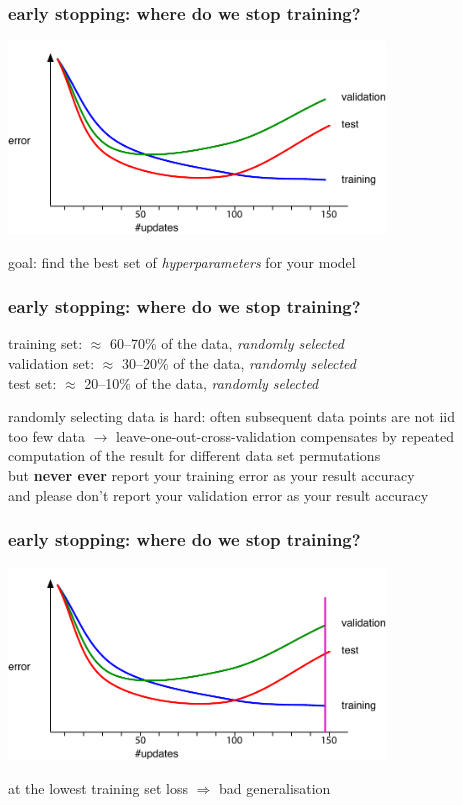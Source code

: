 \documentclass[USenglish,pdftex,compress,10pt,svgnamesi,handout]{beamer}
\begin{document}
\begin{frame}
    \frametitle{early stopping: where do we stop training?}
\includegraphics[width=10cm]{pics/train-val-test.pdf}

goal: find the best set of \textsl{hyperparameters} for your model
\end{frame}
\begin{frame}
    \frametitle{early stopping: where do we stop training?}
training set: $\approx$ 60--70\% of the data, \textsl{randomly selected}\\
validation set: $\approx$ 30--20\% of the data,  \textsl{randomly selected}\\
test set: $\approx$ 20--10\% of the data,  \textsl{randomly selected}

\pause randomly selecting data is hard: often subsequent data points are not iid\\[0.5em]
\pause too few data $\rightarrow$ leave-one-out-cross-validation compensates by repeated computation of the result for different data set permutations\\[0.5em]
\pause but \textbf{never ever} report your training error as your result accuracy\\[0.5em]
\pause and please don't report your validation error as your result accuracy
\end{frame}
\begin{frame}
    \frametitle{early stopping: where do we stop training?}
\includegraphics[width=10cm]{pics/train-val-test-1.pdf}

at the lowest training set loss $\Longrightarrow$ bad generalisation
\end{frame}
\end{document}
